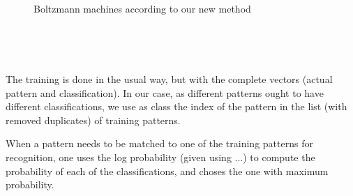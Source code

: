 \ \ \ \ \ \ \ \ \ \ \ \ \ \ \ \ \ \begin{figure}[h]
  \ \ \ \ \ \ \ \ \ \ \ \ \
  \centering
  \caption{Boltzmann machines according to our new method}
\end{figure} \ \ \ \ \ \ \ \ \ \ \ \ \ \ \ \ \ \ \ \ \ \ \ \ \ \ \ \ \ \ \ \ \
\ \ \ \ \ \

\ \ \ \ \ \ \ \ \ \ \ \ \ \ \ \ \ \ \ \ \ \ \ \ \ \ \ \ \ \ \ \ \ \

The training is done in the usual way, but with the complete vectors (actual
pattern and classification). In our case, as different patterns ought to have
different classifications, we use as class the index of the pattern in the list
(with removed duplicates) of training patterns.

When a pattern needs to be matched to one of the training patterns for
recognition, one uses the log probability (given using ...) to compute the
probability of each of the classifications, and choses the one with maximum
probability.



